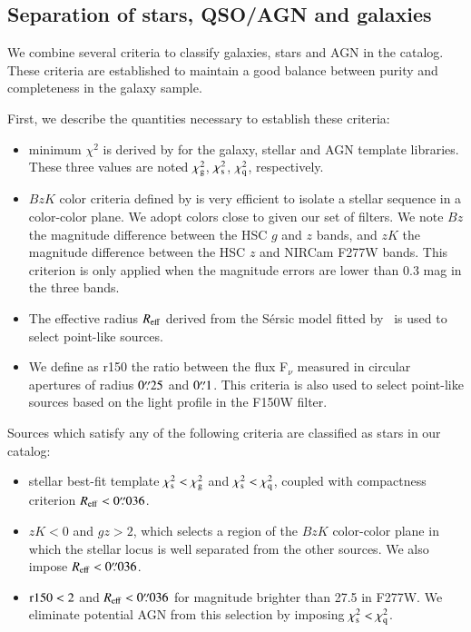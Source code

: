 \documentclass[longauth]{aa}
\begin{document}
\subsection{Separation of stars, QSO/AGN and galaxies} \label{sec:star-galxy-separation}

We combine several criteria to classify galaxies, stars and AGN in the catalog. These criteria are established to maintain a good balance between purity and completeness in the galaxy sample.

First, we describe the quantities necessary to establish these criteria:
\begin{itemize}
    \item minimum $\chi^2$ is derived by \lephare{} for the galaxy, stellar and AGN template libraries. These three values are noted $\chi^2_{\rm{g}}$, $\chi^2_{\rm{s}}$, $\chi^2_{\rm{q}}$, respectively.
    \item $BzK$ color criteria defined by \citet{Daddi_BzK_2004} is very efficient to isolate a stellar sequence in a color-color plane. We adopt colors close to \citet{Daddi_BzK_2004} given our set of filters. We note $Bz$ the magnitude difference between the HSC $g$ and $z$ bands, and $zK$ the magnitude difference between the HSC $z$ and NIRCam F277W bands. This criterion is only applied when the magnitude errors are lower than 0.3 mag in the three bands. 
    \item The effective radius $R_{\rm{eff}}$ derived from the Sérsic model fitted by \SEpp\ is used to select point-like sources. 
    \item We define as r150 the ratio between the flux F$_{\nu}$ measured in circular apertures of radius $0{\overset{\prime\prime}{.}}25$ and  $0{\overset{\prime\prime}{.}}1$. This criteria is also used to select point-like sources based on the light profile in the F150W filter.
\end{itemize}

Sources which satisfy any of the following criteria are classified as stars in our catalog:
\begin{itemize}
    \item stellar best-fit template $\chi^2_{\rm{s}}<\chi^2_{\rm{g}}$ and $\chi^2_{\rm{s}}<\chi^2_{\rm{q}}$, coupled with compactness criterion $R_{\rm{eff}}<0{\overset{\prime\prime}{.}}036$.
    \item $zK<0$ and $gz>2$, which selects a region of the $BzK$ color-color plane in which the stellar locus is well separated from the other sources. We also impose $R_{\rm{eff}}<0{\overset{\prime\prime}{.}}036$. 
    \item $\rm{r150}<2$ and $R_{\rm{eff}}<0{\overset{\prime\prime}{.}}036$ for magnitude brighter than 27.5 in F277W. We eliminate potential AGN from this selection by imposing $\chi^2_{\rm{s}}<\chi^2_{\rm{q}}$.
\end{itemize}
\end{document}
